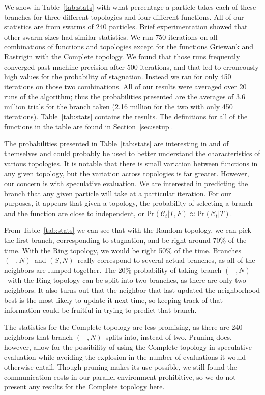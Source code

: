 \documentclass[smallcondensed]{svjour3}
\renewcommand{\sec}[1]{Section~\ref{sec:#1}}
\providecommand{\caseset}{\ensuremath{\mathcal{C}}}
\providecommand{\casepN}{\ensuremath{(-,N)}}
\providecommand{\casexN}{\ensuremath{(S,N)}}
\providecommand{\prob}{\ensuremath{\mathrm{Pr}}}
\begin{document}
We show in Table~\ref{tab:stats} with what percentage a particle takes each of
these branches for three different topologies and four different functions.
All of our statistics are from swarms of 240 particles.  Brief experimentation
showed that other swarm sizes had similar statistics.  We ran 750 iterations on
all combinations of functions and topologies except for the functions Griewank
and Rastrigin with the Complete topology.  We found that those runs frequently
converged past machine precision after 500 iterations, and that led to
erroneously high values for the probability of stagnation.  Instead we ran for
only 450 iterations on those two combinations.  All of our results were
averaged over 20 runs of the algorithm; thus the probabilities presented are
the averages of 3.6 million trials for the branch taken (2.16 million for the
two with only 450 iterations).  Table~\ref{tab:stats} contains the results.
The definitions for all of the functions in the table are found in \sec{setup}.

The probabilities presented in Table~\ref{tab:stats} are interesting in and of
themselves and could probably be used to better understand the characteristics
of various topologies.  It is notable that there is small variation between
functions in any given topology, but the variation across topologies is far
greater.  However, our concern is with speculative evaluation.  We are
interested in predicting the branch that any given particle will take at a
particular iteration.  For our purposes, it appears that given a topology, the
probability of selecting a branch and the function are close to independent, or
$\prob(\caseset_t|T,F) \approx \prob(\caseset_t|T)$.

From Table~\ref{tab:stats} we can see that with the Random topology, we can
pick the first branch, corresponding to stagnation, and be right around 70\% of
the time.  With the Ring topology, we would be right 50\% of the time.
Branches \casepN\ and \casexN\ really correspond to several actual branches, as
all of the neighbors are lumped together.  The 20\% probability of taking
branch \casepN\ with the Ring topology can be split into two branches, as there
are only two neighbors.  It also turns out that the neighbor that last updated
the neighborhood best is the most likely to update it next time, so keeping
track of that information could be fruitful in trying to predict that branch.

The statistics for the Complete topology are less promising, as there are 240
neighbors that branch \casepN\ splits into, instead of two.  Pruning does,
however, allow for the possibility of using the Complete topology in
speculative evaluation while avoiding the explosion in the number of
evaluations it would otherwise entail.  Though pruning makes its use possible,
we still found the communication costs in our parallel environment prohibitive,
so we do not present any results for the Complete topology here.
\end{document}
